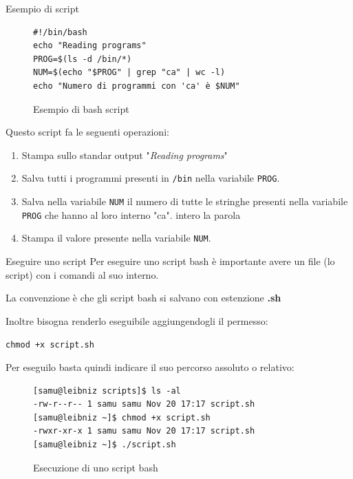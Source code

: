 \documentclass{beamer}
\begin{document}
\begin{frame}[fragile]{Esempio di script}
  \begin{figure}
    \begin{lstlisting}
#!/bin/bash
echo "Reading programs"
PROG=$(ls -d /bin/*)
NUM=$(echo "$PROG" | grep "ca" | wc -l)
echo "Numero di programmi con 'ca' è $NUM"
    \end{lstlisting}
    \caption{Esempio di bash script}
  \end{figure}

  Questo script fa le seguenti operazioni:
  \begin{enumerate}
    \item Stampa sullo standar output "\textit{Reading programs}"
    \item Salva tutti i programmi presenti in \texttt{/bin} nella variabile 
      \texttt{PROG}.
    \item Salva nella variabile \texttt{NUM} il numero di tutte le stringhe 
      presenti nella variabile \texttt{PROG} che hanno al loro interno "ca".
      intero la parola 
    \item Stampa il valore presente nella variabile \texttt{NUM}.
  \end{enumerate}
\end{frame}

\begin{frame}[fragile]{Eseguire uno script}
  Per eseguire uno script bash è importante avere un file (lo script) con i 
  comandi al suo interno. \medskip

  La convenzione è che gli script bash si salvano con estenzione \textbf{.sh}
  \medskip

  Inoltre bisogna renderlo eseguibile aggiungendogli il permesso: \smallskip

  \texttt{chmod +x script.sh} \medskip

  Per eseguilo basta quindi indicare il suo percorso assoluto o relativo:
  \begin{figure}
    \begin{lstlisting}
[samu@leibniz scripts]$ ls -al
-rw-r--r-- 1 samu samu Nov 20 17:17 script.sh
[samu@leibniz ~]$ chmod +x script.sh
-rwxr-xr-x 1 samu samu Nov 20 17:17 script.sh
[samu@leibniz ~]$ ./script.sh
    \end{lstlisting}
    \caption{Esecuzione di uno script bash}
  \end{figure}
\end{frame}

%
\end{document}
